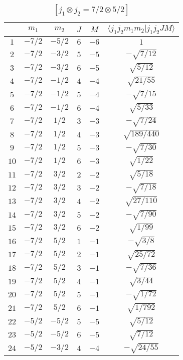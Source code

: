 \begin{table}
\tiny
\caption{$[j_1 \otimes j_2 = 7/2 \otimes 5/2]$}
\begin{center}
\begin{tabular}{|c|c|c|c|c|c|}
\hline 
   & $m_1$ & $m_2$ & $J$ & $M$ & $\langle j_1 j_2 m_1 m_2 | j_1 j_2 J M \rangle$ \\ 
\hline 
$1$ & $-7/2$ & $-5/2$ & $6$ & $-6$ & $1$ \\ 
$2$ & $-7/2$ & $-3/2$ & $5$ & $-5$ & $-\sqrt{7/12}$ \\ 
$3$ & $-7/2$ & $-3/2$ & $6$ & $-5$ & $\sqrt{5/12}$ \\ 
$4$ & $-7/2$ & $-1/2$ & $4$ & $-4$ & $\sqrt{21/55}$ \\ 
$5$ & $-7/2$ & $-1/2$ & $5$ & $-4$ & $-\sqrt{7/15}$ \\ 
$6$ & $-7/2$ & $-1/2$ & $6$ & $-4$ & $\sqrt{5/33}$ \\ 
$7$ & $-7/2$ & $1/2$ & $3$ & $-3$ & $-\sqrt{7/24}$ \\ 
$8$ & $-7/2$ & $1/2$ & $4$ & $-3$ & $\sqrt{189/440}$ \\ 
$9$ & $-7/2$ & $1/2$ & $5$ & $-3$ & $-\sqrt{7/30}$ \\ 
$10$ & $-7/2$ & $1/2$ & $6$ & $-3$ & $\sqrt{1/22}$ \\ 
$11$ & $-7/2$ & $3/2$ & $2$ & $-2$ & $\sqrt{5/18}$ \\ 
$12$ & $-7/2$ & $3/2$ & $3$ & $-2$ & $-\sqrt{7/18}$ \\ 
$13$ & $-7/2$ & $3/2$ & $4$ & $-2$ & $\sqrt{27/110}$ \\ 
$14$ & $-7/2$ & $3/2$ & $5$ & $-2$ & $-\sqrt{7/90}$ \\ 
$15$ & $-7/2$ & $3/2$ & $6$ & $-2$ & $\sqrt{1/99}$ \\ 
$16$ & $-7/2$ & $5/2$ & $1$ & $-1$ & $-\sqrt{3/8}$ \\ 
$17$ & $-7/2$ & $5/2$ & $2$ & $-1$ & $\sqrt{25/72}$ \\ 
$18$ & $-7/2$ & $5/2$ & $3$ & $-1$ & $-\sqrt{7/36}$ \\ 
$19$ & $-7/2$ & $5/2$ & $4$ & $-1$ & $\sqrt{3/44}$ \\ 
$20$ & $-7/2$ & $5/2$ & $5$ & $-1$ & $-\sqrt{1/72}$ \\ 
$21$ & $-7/2$ & $5/2$ & $6$ & $-1$ & $\sqrt{1/792}$ \\ 
$22$ & $-5/2$ & $-5/2$ & $5$ & $-5$ & $\sqrt{5/12}$ \\ 
$23$ & $-5/2$ & $-5/2$ & $6$ & $-5$ & $\sqrt{7/12}$ \\ 
$24$ & $-5/2$ & $-3/2$ & $4$ & $-4$ & $-\sqrt{24/55}$ \\ 

\end{tabular}
\end{center}
\end{table}

